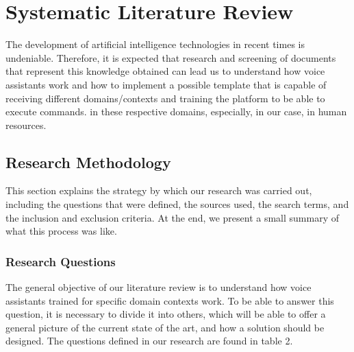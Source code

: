 \chapter{Systematic Literature Review}

\label{chapter:systematic_review}

\newcommand{\RQI}{What are the main artificial intelligence and machine learning technologies related to voice user interfaces, specially in Speech Recognition, Speech Synthesis, Natural Language Processing, and Trigger-word detection?}

\newcommand{\RQII}{What is the state-of-the-art and the main services that exist in the market on Voice User Interfaces?}

\newcommand{\RQIII}{How does one implement a Voice User Assistants(VUIs) for domain-specific contexts?}

The development of artificial intelligence technologies in recent times is undeniable. Therefore, it is expected that research and screening of documents that represent this knowledge obtained can lead us to understand how voice assistants work and how to implement a possible template that is capable of receiving different domains/contexts and training the platform to be able to execute commands. in these respective domains, especially, in our case, in human resources.

\section{Research Methodology}

This section explains the strategy by which our research was carried out, including the questions that were defined, the sources used, the search terms, and the inclusion and exclusion criteria. At the end, we present a small summary of what this process was like.

\subsection{Research Questions}

The general objective of our literature review is to understand how voice assistants trained for specific domain contexts work. To be able to answer this question, it is necessary to divide it into others, which will be able to offer a general picture of the current state of the art, and how a solution should be designed. The questions defined in our research are found in table 2.

